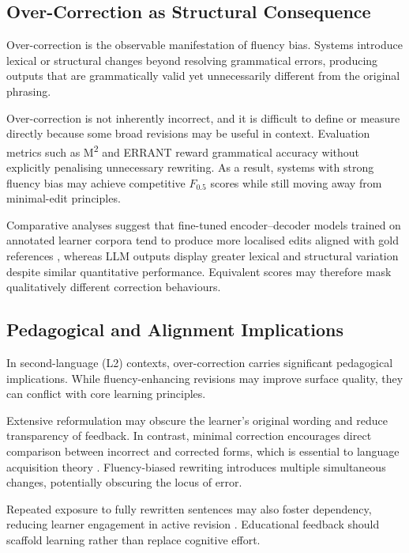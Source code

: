 \subsection{Over-Correction as Structural Consequence}

Over-correction is the observable manifestation of fluency bias. Systems introduce lexical or structural changes beyond resolving grammatical errors, producing outputs that are grammatically valid yet unnecessarily different from the original phrasing.

Over-correction is not inherently incorrect, and it is difficult to define or measure directly because some broad revisions may be useful in context. Evaluation metrics such as M\textsuperscript{2} and ERRANT reward grammatical accuracy without explicitly penalising unnecessary rewriting. As a result, systems with strong fluency bias may achieve competitive $F_{0.5}$ scores while still moving away from minimal-edit principles.

Comparative analyses suggest that fine-tuned encoder--decoder models trained on annotated learner corpora tend to produce more localised edits aligned with gold references \cite{ng-etal-2014-conll,bryant-etal-2019-bea}, whereas LLM outputs display greater lexical and structural variation despite similar quantitative performance. Equivalent scores may therefore mask qualitatively different correction behaviours.

\subsection{Pedagogical and Alignment Implications}

In second-language (L2) contexts, over-correction carries significant pedagogical implications. While fluency-enhancing revisions may improve surface quality, they can conflict with core learning principles.

Extensive reformulation may obscure the learner's original wording and reduce transparency of feedback. In contrast, minimal correction encourages direct comparison between incorrect and corrected forms, which is essential to language acquisition theory \cite{schmidt1990role}. Fluency-biased rewriting introduces multiple simultaneous changes, potentially obscuring the locus of error.

Repeated exposure to fully rewritten sentences may also foster dependency, reducing learner engagement in active revision \cite{ke2019automated}. Educational feedback should scaffold learning rather than replace cognitive effort.

